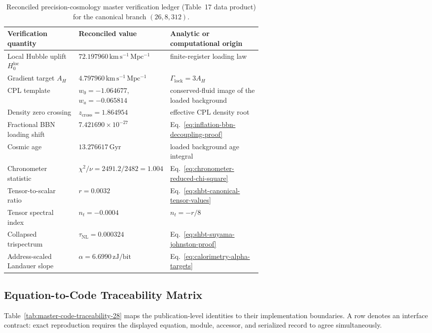 \documentclass[11pt,letterpaper]{article}
\theoremstyle{plain}
\newcommand{\kmsmpc}{\mathrm{km\,s^{-1}\,Mpc^{-1}}}
\newcommand{\GammaLock}{\Gamma_{\text{lock}}}
\begin{document}
\begin{table}[htbp]
\centering
\small
\begin{tabularx}{\linewidth}{@{}L{0.29\linewidth}L{0.31\linewidth}Y@{}}
\toprule
Verification quantity & Reconciled value & Analytic or computational origin \\
\midrule
Local Hubble uplift \(H_0^{\mathrm{loc}}\) & \(72.197960\,\kmsmpc\) & finite-register loading law \\
Gradient target \(A_H\) & \(4.797960\,\kmsmpc\) & \(\GammaLock=3A_H\) \\
CPL template & \(w_0=-1.064677\), \(w_a=-0.065814\) & conserved-fluid image of the loaded background \\
Density zero crossing & \(z_{\mathrm{cross}}=1.864954\) & effective CPL density root \\
Fractional BBN loading shift & \(7.421690\times10^{-27}\) & Eq.~\eqref{eq:inflation-bbn-decoupling-proof} \\
Cosmic age & \(13.276617\,\mathrm{Gyr}\) & loaded background age integral \\
Chronometer statistic & \(\chi^2/\nu=2491.2/2482=1.004\) & Eq.~\eqref{eq:chronometer-reduced-chi-square} \\
Tensor-to-scalar ratio & \(r=0.0032\) & Eq.~\eqref{eq:shbt-canonical-tensor-values} \\
Tensor spectral index & \(n_t=-0.0004\) & \(n_t=-r/8\) \\
Collapsed trispectrum & \(\tau_{\mathrm{NL}}=0.000324\) & Eq.~\eqref{eq:shbt-suyama-johnston-proof} \\
Address-scaled Landauer slope & \(\alpha=6.6990\,\mathrm{zJ/bit}\) & Eq.~\eqref{eq:calorimetry-alpha-targets} \\
\bottomrule
\end{tabularx}
\caption{Reconciled precision-cosmology master verification ledger
(Table~17 data product) for the canonical branch \((26,8,312)\).}
\label{tab:master-verification-table-17}
\end{table}

\subsection{Equation-to-Code Traceability Matrix}

Table~\ref{tab:master-code-traceability-28} maps the publication-level
identities to their implementation boundaries.  A row denotes an interface
contract: exact reproduction requires the displayed equation, module, accessor,
and serialized record to agree simultaneously.
\end{document}

